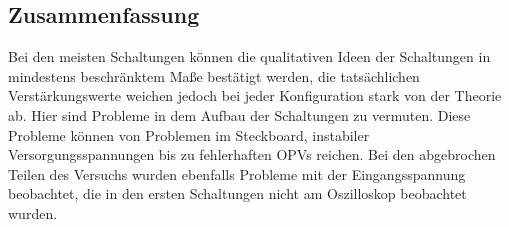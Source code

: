 \subsection{Zusammenfassung}
Bei den meisten Schaltungen können die qualitativen Ideen der Schaltungen in mindestens beschränktem Maße bestätigt werden, die tatsächlichen Verstärkungswerte weichen jedoch bei jeder Konfiguration stark von der Theorie ab. Hier sind Probleme in dem Aufbau der Schaltungen zu vermuten.
Diese Probleme können von Problemen im Steckboard, instabiler Versorgungsspannungen bis zu fehlerhaften OPVs reichen. Bei den abgebrochen Teilen des Versuchs wurden ebenfalls Probleme mit der Eingangsspannung beobachtet, die in den ersten Schaltungen nicht am Oszilloskop beobachtet wurden.